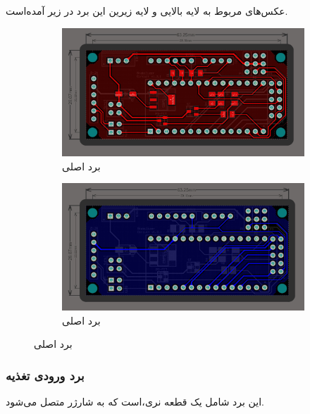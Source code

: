 \documentclass[a4paper,12pt]{report}
\begin{document}
		عکس‌های مربوط به لایه بالایی و لایه زیرین این برد در زیر آمده‌است.

		\begin{figure}[!h]
			\centering
			\begin{subfigure}{0.6\linewidth}
				\includegraphics[width=0.9\linewidth]{resources/altium-main-board-top-layer.jpg}
				\caption{
				برد اصلی
				}
				\label{subfig1:fig1:subsubsec2:subsec2:sec3:chap2}
			\end{subfigure}\vspace*{5mm}
			\begin{subfigure}{0.6\linewidth}
				\includegraphics[width=0.9\linewidth]{resources/altium-main-board-bottom-layer.jpg}
				\caption{
				برد اصلی
				}
				\label{subfig2:fig1:subsubsec2:subsec2:sec3:chap2}
			\end{subfigure}
			\caption{
			برد اصلی}
			\label{fig1:subsubsec2:subsec2:sec3:chap2}
		\end{figure}

	\pagebreak
	\subsubsection{
		برد ورودی تغذیه
	}\label{subsubsec2:subsec2:sec3:chap2}
		این برد شامل یک قطعه
		نری،‌است که به شارژر متصل می‌شود.
\end{document}
